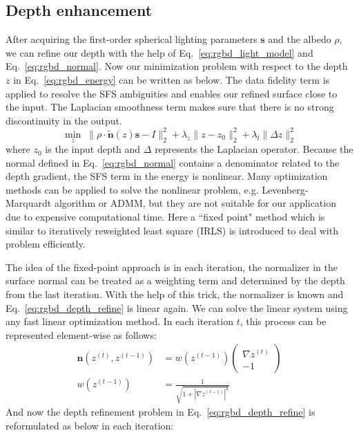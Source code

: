 \subsection{Depth enhancement}
After acquiring the first-order spherical lighting parameters $\mathbf{s}$ and the albedo $\rho$, we can refine our depth with the help of Eq.~\ref{eq:rgbd_light_model} and Eq.~\ref{eq:rgbd_normal}.
Now our minimization problem with respect to the depth $z$ in Eq.~\ref{eq:rgbd_energy} can be written as below. 
The data fidelity term is applied to resolve the SFS ambiguities and enables our refined surface close to the input. The Laplacian smoothness term makes sure that there is no strong discontinuity in the output. 
\begin{equation}\label{eq:rgbd_depth_refine}
    \min_{z} \; \lVert \rho \cdot \tilde{\mathbf{n}}(z) \mathbf{s} - I \rVert^2_2 + \lambda_z \lVert z - z_0\rVert^2_2 + \lambda_l \lVert \Delta z \rVert^2_2
\end{equation}
where $z_0$ is the input depth and $\Delta$ represents the  Laplacian operator. 
Because the normal defined in Eq.~\ref{eq:rgbd_normal} contains a denominator related to the depth gradient, the SFS term in the energy is nonlinear. 
Many optimization methods can be applied to solve the nonlinear problem, e.g. Levenberg-Marquardt algorithm or ADMM, but they are not suitable for our application due to expensive computational time. 
Here a ``fixed point" method which is similar to iteratively reweighted least square (IRLS) is introduced to deal with problem efficiently. 

The idea of the fixed-point approach is in each iteration, the normalizer in the surface normal can be treated as a weighting term and determined by the depth from the last iteration.
With the help of this trick, the normalizer is known and Eq.~\ref{eq:rgbd_depth_refine} is linear again.
We can solve the linear system using any fast linear optimization method.
In each iteration $t$, this process can be represented element-wise as follows:
\begin{equation}
    \begin{split}
        \mathbf{n}(z^{(t)}, z^{(t-1)}) &= w(z^{(t-1)})
        \begin{pmatrix} 
             \nabla z^{(t)}\\ 
             -1
             \end{pmatrix}\\
             w(z^{(t-1)}) &=  \frac{1}{\sqrt{1 + |\nabla z^{(t-1)}|^2}}
    \end{split}
\end{equation}
And now the depth refinement problem in Eq.~\ref{eq:rgbd_depth_refine} is reformulated as below in each iteration:

